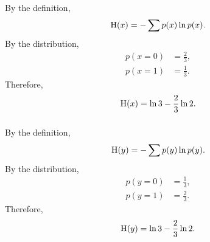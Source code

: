 \subsubsection{}
By the definition,
%
\begin{equation}
{\rm H}(x) 
= 
- 
\sum 
p(x)
\ln p(x).
\end{equation}
%
By the distribution,
%
\begin{equation}
\begin{aligned}
p(x = 0) 
&= 
\frac{2}{3}, \\
p(x = 1) 
&= 
\frac{1}{3}.
\end{aligned}
\end{equation}
%
Therefore,
%
\begin{equation}
{\rm H}(x) 
= 
\ln 3 
- 
\frac{2}{3} 
\ln 2.
\end{equation}
%


\subsubsection{}
By the definition,
%
\begin{equation}
{\rm H}(y) 
= 
- 
\sum 
p(y) 
\ln p(y).
\end{equation}
%
By the distribution,
%
\begin{equation}
\begin{aligned}
p(y = 0) 
&= 
\frac{1}{3}, 
\\
p(y = 1) 
&= 
\frac{2}{3}.
\end{aligned}
\end{equation}
%
Therefore,
%
\begin{equation}
{\rm H}(y) 
= 
\ln 3 
- 
\frac{2}{3} \ln 2.
\end{equation}
%


